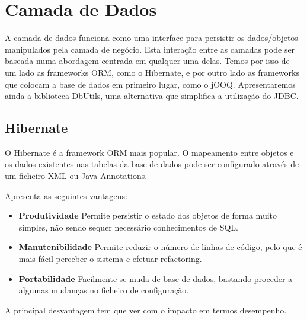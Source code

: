 \section{Camada de Dados}
A camada de dados funciona como uma interface para persistir os dados/objetos manipulados pela camada de negócio. Esta interação entre as camadas pode ser baseada numa abordagem centrada em qualquer uma delas. Temos por isso de um lado as frameworks ORM, como o Hibernate, e por outro lado as frameworks que colocam a base de dados em primeiro lugar, como o jOOQ. Apresentaremos ainda a biblioteca DbUtils, uma alternativa que simplifica a utilização do JDBC.
\subsection{Hibernate}
O Hibernate é a framework ORM mais popular. O mapeamento entre objetos e os dados existentes nas tabelas da base de dados pode ser configurado através de um ficheiro XML ou Java Annotations.\par
Apresenta as seguintes vantagens:
\begin{itemize}
\item \textbf{Produtividade} Permite persistir o estado dos objetos de forma muito simples, não sendo sequer necessário conhecimentos de SQL.
\item \textbf{Manutenibilidade} Permite reduzir o número de linhas de código, pelo que é mais fácil perceber o sistema e efetuar refactoring.
\item \textbf{Portabilidade} Facilmente se muda de base de dados, bastando proceder a algumas mudanças no ficheiro de configuração.
\end{itemize}
A principal desvantagem tem que ver com o impacto em termos desempenho.
